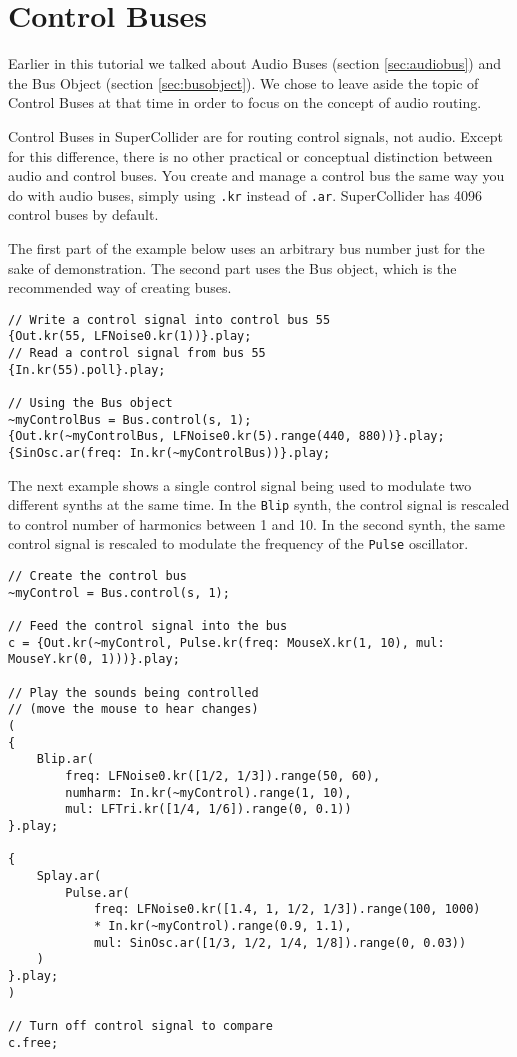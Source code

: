\section{Control Buses}
\label{sec:control-buses}

Earlier in this tutorial we talked about Audio Buses (section \ref{sec:audiobus}) and the Bus Object (section \ref{sec:busobject}). We chose to leave aside the topic of Control Buses at that time in order to focus on the concept of audio routing.

Control Buses in SuperCollider are for routing control signals, not audio. Except for this difference, there is no other practical or conceptual distinction between audio and control buses. You create and manage a control bus the same way you do with audio buses, simply using \texttt{.kr} instead of \texttt{.ar}. SuperCollider has 4096 control buses by default.

The first part of the example below uses an arbitrary bus number just for the sake of demonstration. The second part uses the Bus object, which is the recommended way of creating buses.

\begin{lstlisting}[style=SuperCollider-IDE, basicstyle=\scttfamily\footnotesize]
// Write a control signal into control bus 55
{Out.kr(55, LFNoise0.kr(1))}.play;
// Read a control signal from bus 55
{In.kr(55).poll}.play;

// Using the Bus object
~myControlBus = Bus.control(s, 1);
{Out.kr(~myControlBus, LFNoise0.kr(5).range(440, 880))}.play;
{SinOsc.ar(freq: In.kr(~myControlBus))}.play;
\end{lstlisting}

The next example shows a single control signal being used to modulate two different synths at the same time. In the \texttt{Blip} synth, the control signal is rescaled to control number of harmonics between 1 and 10. In the second synth, the same control signal is rescaled to modulate the frequency of the \texttt{Pulse} oscillator.

\begin{lstlisting}[style=SuperCollider-IDE, basicstyle=\scttfamily\footnotesize]
// Create the control bus
~myControl = Bus.control(s, 1);

// Feed the control signal into the bus
c = {Out.kr(~myControl, Pulse.kr(freq: MouseX.kr(1, 10), mul: MouseY.kr(0, 1)))}.play;

// Play the sounds being controlled
// (move the mouse to hear changes)
(
{
	Blip.ar(
		freq: LFNoise0.kr([1/2, 1/3]).range(50, 60),
		numharm: In.kr(~myControl).range(1, 10),
		mul: LFTri.kr([1/4, 1/6]).range(0, 0.1))
}.play;

{
	Splay.ar(
		Pulse.ar(
			freq: LFNoise0.kr([1.4, 1, 1/2, 1/3]).range(100, 1000)
			* In.kr(~myControl).range(0.9, 1.1),
			mul: SinOsc.ar([1/3, 1/2, 1/4, 1/8]).range(0, 0.03))
	)
}.play;
)

// Turn off control signal to compare
c.free;
\end{lstlisting}

